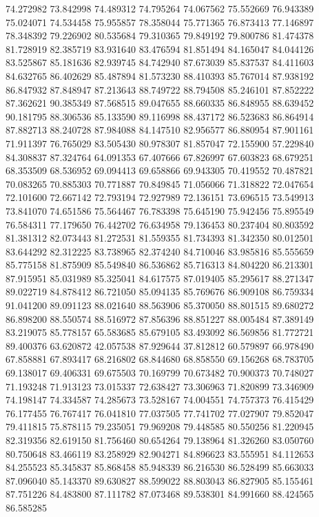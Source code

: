 74.272982
73.842998
74.489312
74.795264
74.067562
75.552669
76.943389
75.024071
74.534458
75.955857
78.358044
75.771365
76.873413
77.146897
78.348392
79.226902
80.535684
79.310365
79.849192
79.800786
81.474378
81.728919
82.385719
83.931640
83.476594
81.851494
84.165047
84.044126
83.525867
85.181636
82.939745
84.742940
87.673039
85.837537
84.411603
84.632765
86.402629
85.487894
81.573230
88.410393
85.767014
87.938192
86.847932
87.848947
87.213643
88.749722
88.794508
85.246101
87.852222
87.362621
90.385349
87.568515
89.047655
88.660335
86.848955
88.639452
90.181795
88.306536
85.133590
89.116998
88.437172
86.523683
86.864914
87.882713
88.240728
87.984088
84.147510
82.956577
86.880954
87.901161
71.911397
76.765029
83.505430
80.978307
81.857047
72.155900
57.229840
84.308837
87.324764
64.091353
67.407666
67.826997
67.603823
68.679251
68.353509
68.536952
69.094413
69.658866
69.943305
70.419552
70.487821
70.083265
70.885303
70.771887
70.849845
71.056066
71.318822
72.047654
72.101600
72.667142
72.793194
72.927989
72.136151
73.696515
73.549913
73.841070
74.651586
75.564467
76.783398
75.645190
75.942456
75.895549
76.584311
77.179650
76.442702
76.634958
79.136453
80.237404
80.803592
81.381312
82.073443
81.272531
81.559355
81.734393
81.342350
80.012501
83.644292
82.312225
83.738965
82.374240
84.710046
83.985816
85.555659
85.775158
81.875909
85.549840
86.536862
85.716313
84.804220
86.213301
87.915951
85.031989
85.325041
84.617575
87.019405
85.295617
88.271347
89.022719
84.878412
86.721050
85.094135
85.769676
86.909108
86.759334
91.041200
89.091123
88.021640
88.563906
85.370050
88.801515
89.680272
86.898200
88.550574
88.516972
87.856396
88.851227
88.005484
87.389149
83.219075
85.778157
65.583685
85.679105
83.493092
86.569856
81.772721
89.400376
63.620872
42.057538
87.929644
37.812812
60.579897
66.978490
67.858881
67.893417
68.216802
68.844680
68.858550
69.156268
68.783705
69.138017
69.406331
69.675503
70.169799
70.673482
70.900373
70.748027
71.193248
71.913123
73.015337
72.638427
73.306963
71.820899
73.346909
74.198147
74.334587
74.285673
73.528167
74.004551
74.757373
76.415429
76.177455
76.767417
76.041810
77.037505
77.741702
77.027907
79.852047
79.411815
75.878115
79.235051
79.969208
79.448585
80.550256
81.220945
82.319356
82.619150
81.756460
80.654264
79.138964
81.326260
83.050760
80.750648
83.466119
83.258929
82.904271
84.896623
83.555951
84.112653
84.255523
85.345837
85.868458
85.948339
86.216530
86.528499
85.663033
87.096040
85.143370
89.630827
88.599022
88.803043
86.827905
85.155461
87.751226
84.483800
87.111782
87.073468
89.538301
84.991660
88.424565
86.585285

